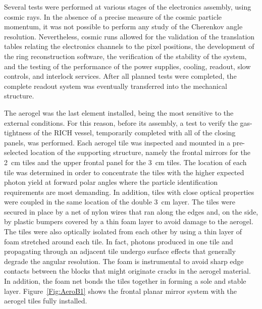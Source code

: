 \documentclass[5p,times,twocolumn]{elsarticle}
\begin{document}
Several tests were performed at various stages of the electronics assembly, using cosmic rays.
In the absence of a precise measure of the cosmic particle momentum, it was not possible to perform any study of
the Cherenkov angle resolution. Nevertheless, cosmic runs allowed for the validation of the translation tables relating
the electronics channels to the pixel positions, the development of the ring reconstruction software, the verification of
the stability of the system, and the testing of the performance of the power supplies, cooling, readout, slow controls,
and interlock services. After all planned tests were completed, the complete readout system was eventually transferred
into the mechanical structure.

The aerogel was the last element installed, being the most sensitive to the external conditions. For this reason, before
its assembly, a test to verify the gas-tightness of the RICH vessel, temporarily completed with all of the closing panels,
was performed. Each aerogel tile was inspected and mounted in a pre-selected location of the supporting structure,
namely the frontal mirrors for the 2~cm tiles and the upper frontal panel for the 3~cm tiles. The location of
each tile was determined in order to concentrate the tiles with the higher expected photon yield at forward polar
angles where the particle identification requirements are most demanding. In addition, tiles with close optical
properties were coupled in the same location of the double 3~cm layer. The tiles were secured in place by a net of
nylon wires that ran along the edges and, on the side, by plastic bumpers covered by a thin foam layer to avoid
damage to the aerogel. The tiles were also optically isolated from each other by using a thin layer of foam stretched around
each tile. In fact, photons produced in one tile and propagating through an adjacent tile undergo surface effects that
generally degrade the angular resolution. The foam is instrumental to avoid sharp edge contacts between the blocks
that might originate cracks in the aerogel material. In addition, the foam net bonds the tiles together in forming a sole
and stable layer. Figure~\ref{Fig:AeroB1} shows the frontal planar mirror system with the aerogel tiles fully installed.
\end{document}
